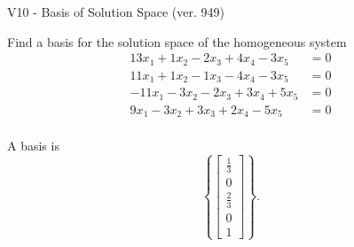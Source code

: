 \begin{exercise}
  \begin{exerciseTitle}V10 - Basis of Solution Space (ver. 949)\end{exerciseTitle}
  \begin{exerciseStatement}
    Find a basis for the solution space of the homogeneous system 
\begin{align*}
 13 x_ 1 + 1 x_ 2 -2 x_ 3 + 4 x_ 4 -3 x_ 5 &= 0  \\ 
  11 x_ 1 + 1 x_ 2 -1 x_ 3 -4 x_ 4 -3 x_ 5 &= 0  \\ 
  -11 x_ 1 -3 x_ 2 -2 x_ 3 + 3 x_ 4 + 5 x_ 5 &= 0  \\ 
  9 x_ 1 -3 x_ 2 + 3 x_ 3 + 2 x_ 4 -5 x_ 5 &= 0  \\ 
 \end{align*}


 
  \end{exerciseStatement}

  \begin{exerciseAnswer}
   A basis is   
\[\left\{\left[\begin{array}{c}
\frac{1}{3} \\
0 \\
\frac{2}{3} \\
0 \\
1
\end{array}\right]\right\}.\]

  


  \end{exerciseAnswer}
\end{exercise}